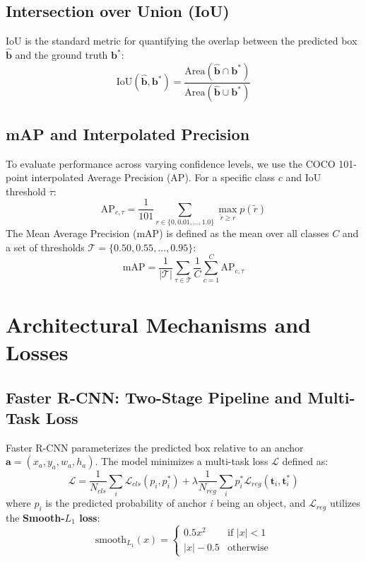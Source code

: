 \documentclass[conference]{IEEEtran}
\begin{document}
\subsection{Intersection over Union (IoU)}
IoU is the standard metric for quantifying the overlap between the predicted box $\hat{\mathbf{b}}$ and the ground truth $\mathbf{b}^*$:
\begin{equation}
    \text{IoU}(\hat{\mathbf{b}}, \mathbf{b}^*) = \frac{\text{Area}(\hat{\mathbf{b}} \cap \mathbf{b}^*)}{\text{Area}(\hat{\mathbf{b}} \cup \mathbf{b}^*)}
\end{equation}

\subsection{mAP and Interpolated Precision}
To evaluate performance across varying confidence levels, we use the COCO 101-point interpolated Average Precision (AP). For a specific class $c$ and IoU threshold $\tau$:
\begin{equation}
    \text{AP}_{c,\tau} = \frac{1}{101} \sum_{r \in \{0, 0.01, \dots, 1.0\}} \max_{\tilde{r} \geq r} p(\tilde{r})
\end{equation}
The Mean Average Precision (mAP) is defined as the mean over all classes $C$ and a set of thresholds $\mathcal{T} = \{0.50, 0.55, \dots, 0.95\}$:
\begin{equation}
    \text{mAP} = \frac{1}{|\mathcal{T}|} \sum_{\tau \in \mathcal{T}} \frac{1}{C} \sum_{c=1}^{C} \text{AP}_{c,\tau}
\end{equation}

\section{Architectural Mechanisms and Losses}

\subsection{Faster R-CNN: Two-Stage Pipeline and Multi-Task Loss}
Faster R-CNN parameterizes the predicted box relative to an anchor $\mathbf{a} = (x_a, y_a, w_a, h_a)$. The model minimizes a multi-task loss $\mathcal{L}$ defined as:
\begin{equation}
    \mathcal{L} = \frac{1}{N_{cls}} \sum_i \mathcal{L}_{cls}(p_i, p_i^*) + \lambda \frac{1}{N_{reg}} \sum_i p_i^* \mathcal{L}_{reg}(\mathbf{t}_i, \mathbf{t}_i^*)
\end{equation}
where $p_i$ is the predicted probability of anchor $i$ being an object, and $\mathcal{L}_{reg}$ utilizes the \textbf{Smooth-$L_1$ loss}:
\begin{equation}
    \text{smooth}_{L_1}(x) = \begin{cases} 0.5x^2 & \text{if } |x| < 1 \\ |x| - 0.5 & \text{otherwise} \end{cases}
\end{equation}
\end{document}
